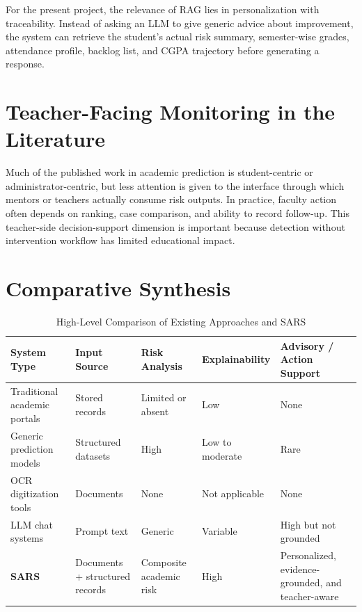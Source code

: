 For the present project, the relevance of RAG lies in personalization with traceability. Instead of asking an LLM to give generic advice about improvement, the system can retrieve the student's actual risk summary, semester-wise grades, attendance profile, backlog list, and CGPA trajectory before generating a response.

\section{Teacher-Facing Monitoring in the Literature}
Much of the published work in academic prediction is student-centric or administrator-centric, but less attention is given to the interface through which mentors or teachers actually consume risk outputs. In practice, faculty action often depends on ranking, case comparison, and ability to record follow-up. This teacher-side decision-support dimension is important because detection without intervention workflow has limited educational impact.

\section{Comparative Synthesis}
\begin{table}[H]
\centering
\caption{High-Level Comparison of Existing Approaches and SARS}
\begin{tabularx}{\textwidth}{>{\raggedright\arraybackslash}p{} >{\raggedright\arraybackslash}p{} >{\raggedright\arraybackslash}p{} >{\raggedright\arraybackslash}p{} >{\raggedright\arraybackslash}X}
\toprule
\textbf{System Type} & \textbf{Input Source} & \textbf{Risk Analysis} & \textbf{Explainability} & \textbf{Advisory / Action Support} \\
\midrule
Traditional academic portals & Stored records & Limited or absent & Low & None \\
Generic prediction models & Structured datasets & High & Low to moderate & Rare \\
OCR digitization tools & Documents & None & Not applicable & None \\
LLM chat systems & Prompt text & Generic & Variable & High but not grounded \\
\textbf{SARS} & Documents + structured records & Composite academic risk & High & Personalized, evidence-grounded, and teacher-aware \\
\bottomrule
\end{tabularx}
\end{table}

